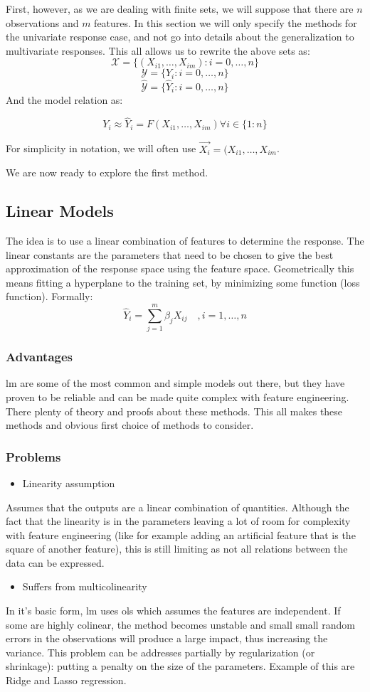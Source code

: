 First, however, as we are dealing with finite sets, we will suppose that there are $n$ observations and $m$ features. In this section we will only specify the methods for the univariate response case, and not go into details about the generalization to multivariate responses. This all allows us to rewrite the above sets as:
$$\mathcal{X}=\{(X_{i1},\dots,X_{im}) : i=0,\dots,n\}$$
$$\mathcal{Y}=\{Y_i : i=0,\dots,n\}$$
$$\hat{\mathcal{Y}}=\{\hat{Y}_i : i=0,\dots,n\}$$
And the model relation as:

$$
Y_i \approx \hat{Y}_i = F(X_{i1},\dots,X_{im}) \forall i \in \{1:n\}
$$

For simplicity in notation, we will often use $ \vec{X_i}=(X_{i1},\dots,X_{im} $.

We are now ready to explore the first method.

\subsection{Linear Models}
The idea is to use a linear combination of features to determine the response. The linear constants are the parameters that need to be chosen to give the best approximation of the response space using the feature space. Geometrically this means fitting a hyperplane to the training set, by minimizing some function (loss function).
Formally:
$$
\hat{Y}_i = \sum_{j=1}^m \beta_{j} X_{ij} \quad, i=1,\dots,n
$$

\subsubsection{Advantages}
\acrlong{lm} are some of the most common and simple models out there, but they have proven to be reliable and can be made quite complex with feature engineering. There plenty of theory and proofs about these methods. This all makes these methods and obvious first choice of methods to consider.
\subsubsection{Problems}
\begin{itemize}
\item Linearity assumption
\end{itemize}
Assumes that the outputs are a linear combination of quantities. Although the fact that the linearity is in the parameters leaving a lot of room for complexity with feature engineering (like for example adding an artificial feature that is the square of another feature), this is still limiting as not all relations between the data can be expressed.
\begin{itemize}
\item Suffers from multicolinearity 
\end{itemize}
In it's basic form, \acrlong{lm} uses \acrfull{ols} which assumes the features are independent. If some are highly colinear, the method becomes unstable and small small random errors in the observations will produce a large impact, thus increasing the variance. This problem can be addresses partially by regularization (or shrinkage): putting a penalty on the size of the parameters. Example of this are Ridge and Lasso regression.


